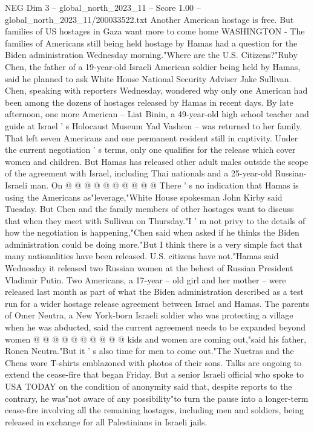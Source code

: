 \begin{textsample}{NEG Dim 3 – global\_north\_2023\_11 – Score 1.00 – global\_north\_2023\_11/200033522.txt}  \label{ex:f3_neg_274}
Another American hostage is free.
But families of US hostages in Gaza want more to come home WASHINGTON - The families of Americans still being held hostage by Hamas had a question for the Biden administration Wednesday morning."Where are the U.S.
Citizens?"Ruby Chen, the father of a 19-year-old Israeli American soldier being held by Hamas, said he planned to ask White House National Security Adviser Jake Sullivan.
Chen, speaking with reporters Wednesday, wondered why only one American had been among the dozens of hostages released by Hamas in recent days.
By late afternoon, one more American -- Liat Binin, a 49-year-old high school teacher and guide at Israel ' s Holocaust Museum Yad Vashem -- was returned to her family.
That left seven Americans and one permanent resident still in captivity.
Under the current negotiation ' s terms, only one qualifies for the release which cover women and children.
But Hamas has released other adult males outside the scope of the agreement with Israel, including Thai nationals and a 25-year-old Russian-Israeli man.
On @ @ @ @ @ @ @ @ @ @ There ' s no indication that Hamas is using the Americans as"leverage,"White House spokesman John Kirby said Tuesday.
But Chen and the family members of other hostages want to discuss that when they meet with Sullivan on Thursday."I ' m not privy to the details of how the negotiation is happening,"Chen said when asked if he thinks the Biden administration could be doing more."But I think there is a very simple fact that many nationalities have been released.
U.S. citizens have not."Hamas said Wednesday it released two Russian women at the behest of Russian President Vladimir Putin.
Two Americans, a 17-year -- old girl and her mother -- were released last month as part of what the Biden administration described as a test run for a wider hostage release agreement between Israel and Hamas.
The parents of Omer Neutra, a New York-born Israeli soldier who was protecting a village when he was abducted, said the current agreement needs to be expanded beyond women @ @ @ @ @ @ @ @ @ @ kids and women are coming out,"said his father, Ronen Neutra."But it ' s also time for men to come out."The Nuetras and the Chens wore T-shirts emblazoned with photos of their sons.
Talks are ongoing to extend the cease-fire that began Friday.
But a senior Israeli official who spoke to USA TODAY on the condition of anonymity said that, despite reports to the contrary, he was"not aware of any possibility"to turn the pause into a longer-term cease-fire involving all the remaining hostages, including men and soldiers, being released in exchange for all Palestinians in Israeli jails.

\end{textsample}
